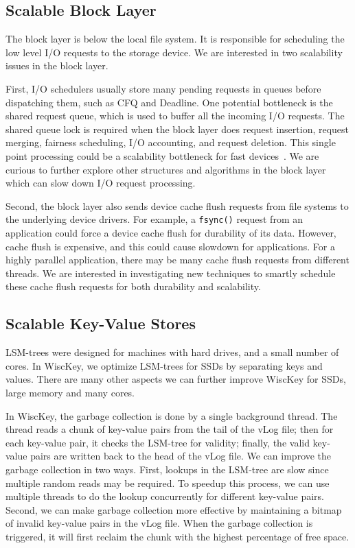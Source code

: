 \subsection{Scalable Block Layer}
The block layer is below the local file system. It is responsible for
scheduling the low level I/O requests to the storage device.  We are
interested in two scalability issues in the block layer.  

First, I/O schedulers usually store many pending requests in queues
before dispatching them, such as CFQ and Deadline.  One potential
bottleneck is the shared request queue, which is used to buffer all
the incoming I/O requests.  The shared queue lock is required when the
block layer does request insertion, request merging, fairness
scheduling, I/O accounting, and request deletion.  This single point
processing could be a scalability bottleneck for fast
devices~\cite{Bjorling+13-SSDSched}.  We are curious to further
explore other structures and algorithms in the block layer which can
slow down I/O request processing.  

Second, the block layer also sends device cache flush requests from
file systems to the underlying device drivers.  For example, a 
{\tt fsync()} request from an application could force a device cache
flush for durability of its data.  However, cache flush is
expensive, and this could cause slowdown for applications.  For a
highly parallel application, there may be many cache flush requests
from different threads.  We are interested in investigating new
techniques to smartly schedule these cache flush requests for both
durability and scalability.  

\subsection{Scalable Key-Value Stores}

LSM-trees were designed for machines with hard drives, and a small
number of cores. In WiscKey, we optimize LSM-trees for SSDs by
separating keys and values. There are many other aspects we can
further improve WiscKey for SSDs, large memory and many cores. 

In WiscKey, the garbage collection is done by a single background
thread.  The thread reads a chunk of key-value pairs from the tail of
the vLog file; then for each key-value pair, it checks the LSM-tree
for validity; finally, the valid key-value pairs are written back to
the head of the vLog file. We can improve the garbage collection in
two ways. First, lookups in the LSM-tree are slow since multiple
random reads may be required.  To speedup this process, we can use
multiple threads to do the lookup concurrently for different key-value 
pairs. Second, we can make garbage collection more effective by
maintaining a bitmap of invalid key-value pairs in the vLog file. When
the garbage collection is triggered, it will first reclaim the chunk
with the highest percentage of free space. 

